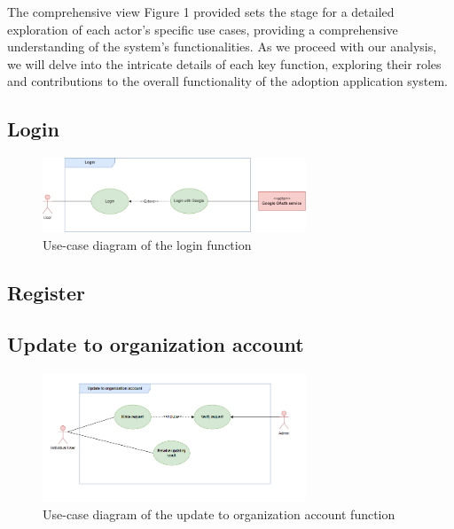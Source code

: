 The comprehensive view Figure 1 provided sets the stage for a detailed exploration of each actor's specific use cases, providing a comprehensive understanding of the system's functionalities. As we proceed with our analysis, we will delve into the intricate details of each key function, exploring their roles and contributions to the overall functionality of the adoption application system.

\subsection{Login}

\begin{figure}[H]
  \centering
  \includegraphics[width=0.7\textwidth]{Figures/login_ucd.png}
  \caption{Use-case diagram of the login function}
  \label{fig:login_activity_diagram}
\end{figure}



\subsection{Register}



\subsection{Update to organization account}

\begin{figure}[H]
  \centering
  \includegraphics[width=0.7\textwidth]{Figures/update_org_ucd.png}
  \caption{Use-case diagram of the update to organization account function}
  \label{fig:update-org_activity_diagram}
\end{figure}

